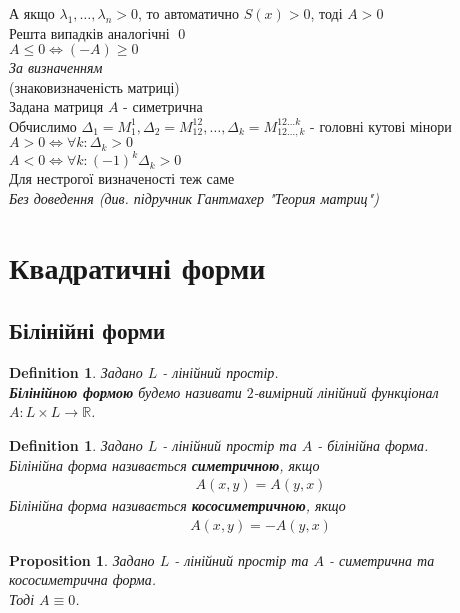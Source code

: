 \documentclass[a4paper, 10pt]{article}
\theoremstyle{theoremdd}
\newtheorem{definition}[theorem]{Definition}
\newtheorem{proposition}[theorem]{Proposition}
\begin{document}
А якщо $\lambda_1,\dots,\lambda_n > 0$, то автоматично $S(x) > 0$, тоді $A>0$\\
Решта випадків аналогічні \qed
\bigskip \\
 $A \leq 0 \iff (-A) \geq 0$\\
\textit{За визначенням}
\bigskip \\
 (знаковизначеність матриці)\\
Задана матриця $A$ - симетрична\\
Обчислимо $\Delta_1 = M_1^1, \Delta_2 = M_{12}^{12}, \dots, \Delta_k = M^{12\dots k}_{12 \dots, k}$ - головні кутові мінори\\
$A>0 \iff \forall k: \Delta_k > 0$\\
$A < 0 \iff \forall k: (-1)^k \Delta_k > 0$\\
Для нестрогої визначеності теж саме\\
\textit{Без доведення (див. підручник Гантмахер "Теория матриц")}
\bigskip \\
\fi

\newpage


\section{Квадратичні форми}
\subsection{Білінійні форми}
\begin{definition}
Задано $L$ - лінійний простір.\\
\textbf{Білінійною формою} будемо називати $2$-вимірний лінійний функціонал $A: L \times L \to \mathbb{R}$.
\end{definition}

\begin{definition}
Задано $L$ - лінійний простір та $A$ - білінійна форма.\\
Білінійна форма називається \textbf{симетричною}, якщо
\begin{align*}
A(x,y) = A(y,x)
\end{align*}
Білінійна форма називається \textbf{кососиметричною}, якщо
\begin{align*}
A(x,y) = -A(y,x)
\end{align*}
\end{definition}

\begin{proposition}
Задано $L$ - лінійний простір та $A$ - симетрична та кососиметрична форма.\\
Тоді $A \equiv 0$.
\end{proposition}
\end{document}
